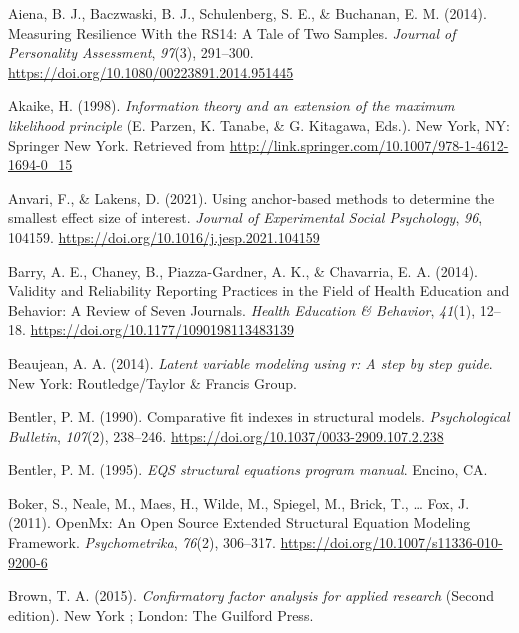 \documentclass[
  man]{apa6}
\newlength{\cslhangindent}
\newlength{\cslentryspacingunit} %
\newenvironment{CSLReferences}[2] %
 {%
  \setlength{\parindent}{0pt}
  \ifodd #1
  \let\oldpar\par
  \def\par{\hangindent=\cslhangindent\oldpar}
  \fi
  \setlength{\parskip}{#2\cslentryspacingunit}
 }%
 {}
\begin{document}
\hypertarget{refs}{}
\begin{CSLReferences}{1}{0}
\leavevmode{}%
Aiena, B. J., Baczwaski, B. J., Schulenberg, S. E., \& Buchanan, E. M. (2014). Measuring Resilience With the RS{\textendash}14: A Tale of Two Samples. \emph{Journal of Personality Assessment}, \emph{97}(3), 291--300. \url{https://doi.org/10.1080/00223891.2014.951445}

\leavevmode{}%
Akaike, H. (1998). \emph{Information theory and an extension of the maximum likelihood principle} (E. Parzen, K. Tanabe, \& G. Kitagawa, Eds.). New York, NY: Springer New York. Retrieved from \url{http://link.springer.com/10.1007/978-1-4612-1694-0_15}

\leavevmode{}%
Anvari, F., \& Lakens, D. (2021). Using anchor-based methods to determine the smallest effect size of interest. \emph{Journal of Experimental Social Psychology}, \emph{96}, 104159. \url{https://doi.org/10.1016/j.jesp.2021.104159}

\leavevmode{}%
Barry, A. E., Chaney, B., Piazza-Gardner, A. K., \& Chavarria, E. A. (2014). Validity and Reliability Reporting Practices in the Field of Health Education and Behavior: A Review of Seven Journals. \emph{Health Education \& Behavior}, \emph{41}(1), 12--18. \url{https://doi.org/10.1177/1090198113483139}

\leavevmode{}%
Beaujean, A. A. (2014). \emph{Latent variable modeling using r: A step by step guide}. New York: Routledge/Taylor \& Francis Group.

\leavevmode{}%
Bentler, P. M. (1990). Comparative fit indexes in structural models. \emph{Psychological Bulletin}, \emph{107}(2), 238--246. \url{https://doi.org/10.1037/0033-2909.107.2.238}

\leavevmode{}%
Bentler, P. M. (1995). \emph{EQS structural equations program manual}. Encino, CA.

\leavevmode{}%
Boker, S., Neale, M., Maes, H., Wilde, M., Spiegel, M., Brick, T., \ldots{} Fox, J. (2011). OpenMx: An Open Source Extended Structural Equation Modeling Framework. \emph{Psychometrika}, \emph{76}(2), 306--317. \url{https://doi.org/10.1007/s11336-010-9200-6}

\leavevmode{}%
Brown, T. A. (2015). \emph{Confirmatory factor analysis for applied research} (Second edition). New York ; London: The Guilford Press.


\end{CSLReferences}
\end{document}
